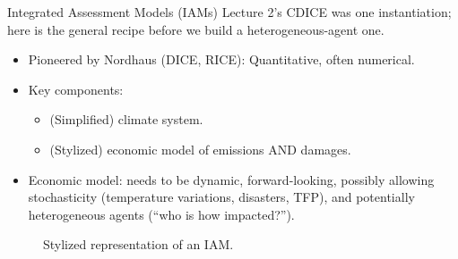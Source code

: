 \documentclass[aspectratio=169,11pt]{beamer}
\begin{document}
\begin{frame}{Integrated Assessment Models (IAMs)}
{\small Lecture 2's CDICE was one instantiation; here is the general recipe before we build a heterogeneous-agent one.}
\begin{itemize}\small
    \item Pioneered by Nordhaus (DICE, RICE): Quantitative, often numerical.
    \item Key components:
    \begin{itemize}
        \item (Simplified) climate system.
        \item (Stylized) economic model of emissions AND damages.
    \end{itemize}
    \item Economic model: needs to be dynamic, forward-looking, possibly allowing stochasticity (temperature variations, disasters, TFP), and potentially heterogeneous agents (``who is how impacted?'').
\end{itemize}
\vfill
\begin{figure}[h]
\centering
{}
\caption{Stylized representation of an IAM.}
\label{fig:IAM_stylized}
\end{figure}
\end{frame}
\end{document}
